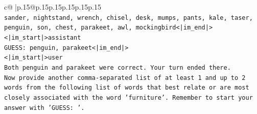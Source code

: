 \documentclass{article}
\begin{document}
{\begin{supertabular}{c@{$\;$}|p{.15\linewidth}@{}p{.15\linewidth}p{.15\linewidth}p{.15\linewidth}p{.15\linewidth}p{.15\linewidth}}
{{{\\ 
\texttt{sander, nightstand, wrench, chisel, desk, mumps, pants, kale, taser, penguin, son, chest, parakeet, awl, mockingbird<|im\_end|>} \\
\texttt{<|im\_start|>assistant} \\
\texttt{GUESS: penguin, parakeet<|im\_end|>} \\
\texttt{<|im\_start|>user} \\
\texttt{Both penguin and parakeet were correct. Your turn ended there.} \\
\texttt{Now provide another comma{-}separated list of at least 1 and up to 2 words from the following list of words that best relate or are most closely associated with the word 'furniture'. Remember to start your answer with 'GUESS: '.} \\
            }
        }
    }
     \\ \\


\end{supertabular}}
\end{document}
